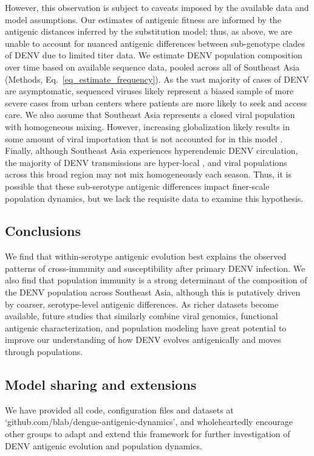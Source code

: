 \documentclass[11pt,oneside,letterpaper]{article}
\begin{document}
However, this observation is subject to caveats imposed by the available data and model assumptions.
Our estimates of antigenic fitness are informed by the antigenic distances inferred by the substitution model; thus, as above, we are unable to account for nuanced antigenic differences between sub-genotype clades of DENV due to limited titer data.
We estimate DENV population composition over time based on available sequence data, pooled across all of Southeast Asia (Methods, Eq.~\ref{eq_estimate_frequency}).
As the vast majority of cases of DENV are asymptomatic, sequenced viruses likely represent a biased sample of more severe cases from urban centers where patients are more likely to seek and access care.
We also assume that Southeast Asia represents a closed viral population with homogeneous mixing.
However, increasing globalization likely results in some amount of viral importation that is not accounted for in this model \citep{allicock2012phylogeography}.
Finally, although Southeast Asia experiences hyperendemic DENV circulation, the majority of DENV transmissions are hyper-local \citep{salje2017dengue}, and viral populations across this broad region may not mix homogeneously each season.
Thus, it is possible that these sub-serotype antigenic differences impact finer-scale population dynamics, but we lack the requisite data to examine this hypothesis.

\subsection*{Conclusions}
We find that within-serotype antigenic evolution best explains the observed patterns of cross-immunity and susceptibility after primary DENV infection.
We also find that population immunity is a strong determinant of the composition of the DENV population across Southeast Asia, although this is putatively driven by coarser, serotype-level antigenic differences.
As richer datasets become available, future studies that similarly combine viral genomics, functional antigenic characterization, and population modeling have great potential to improve our understanding of how DENV evolves antigenically and moves through populations.

\subsection*{Model sharing and extensions}
We have provided all code, configuration files and datasets at `github.com/blab/dengue-antigenic-dynamics', and wholeheartedly encourage other groups to adapt and extend this framework for further investigation of DENV antigenic evolution and population dynamics.
\end{document}
